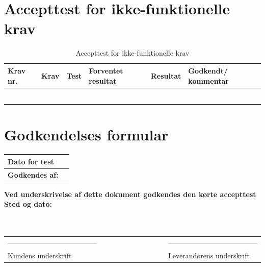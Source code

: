 \newpage

\newpage

\newpage

\newpage

\section{Accepttest for ikke-funktionelle krav}

\begin{longtable}{|>{\raggedright\arraybackslash}p{1.1cm}| >{\raggedright\arraybackslash}p{2.7cm} | >{\raggedright\arraybackslash}p{2.7cm} | >{\raggedright\arraybackslash}p{2.7cm} | >{\raggedright\arraybackslash}p{2.2cm} |>{\raggedright\arraybackslash}p{2.2cm}|}
   \caption{Accepttest for ikke-funktionelle krav}\label{tab:label13}
\\ \hline   
\textbf{Krav nr.}&\textbf{Krav} &\textbf{Test}& \textbf{Forventet resultat} & \textbf{Resultat} & \textbf{Godkendt/ kommentar}\\ \hline
   & & & & & \\\hline
   & & & & & \\\hline
   & & & & & \\\hline
   & & & & & \\\hline
   & & & & & \\\hline
   & & & & & \\\hline
\end{longtable}

\section{Godkendelses formular}
\begin{table}[h!]
\label{tab:tabel14}
\begin{tabular}{| l | >{\raggedright\arraybackslash}p{12cm} |}
   \hline
   \textbf{Dato for test} &\\ \hline
   \textbf{Godkendes af:} & \\ \hline
\end{tabular}
\end{table}
\textbf{Ved underskrivelse af dette dokument godkendes den kørte accepttest}
\newline
\textbf{Sted og dato:}\\
\\
\\
\begin{table}
[h!]
\begin{tabular}{ l lllllllll l}
--------------------------------------&&&&&&&&&&--------------------------------------\\ 
Kundens underskrift &&&&&&&&&&Leverandørens underskrift\\
\end{tabular}
\end{table}